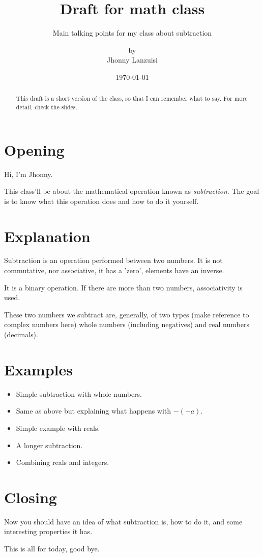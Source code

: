 %
\title{Draft for math class}
\subtitle{Main talking points for my class about subtraction}
\subject{ID2131}
\titlehead{Universidad Simón Bolívar\hfill Caracas, Venezuela}
\author{by \\ Jhonny Lanzuisi}
\date{\today}
\maketitle

\begin{abstract}
  This draft is a short version of the class,
  so that I can remember what to say.
  For more detail, check the slides.
\end{abstract}

\section{Opening}
\label{sec:open}

Hi, I'm Jhonny.

This class'll be about the mathematical operation
known as \emph{subtraction}.
The goal is to know what this operation does and
how to do it yourself.

\section{Explanation}
\label{sec:expla}

Subtraction is an operation performed between two numbers.
It is not commutative, nor associative, it has a 'zero',
elements have an inverse.

It is a binary operation.
If there are more than two numbers,
associativity is used.

These two numbers we subtract are, generally,
of two types (make reference to complex numbers here)
whole numbers (including negatives) and
real numbers (decimals).

\section{Examples}
\label{sec:examp}

\begin{itemize}
\item Simple subtraction with whole numbers.
\item Same as above but explaining what happens with \(-(-a)\).
\item Simple example with reals.
\item A longer subtraction.
\item Combining reals and integers.
\end{itemize}

\section{Closing}
\label{sec:close}

Now you should have an idea of what subtraction is,
how to do it,
and some interesting properties it has.

This is all for today, good bye.
